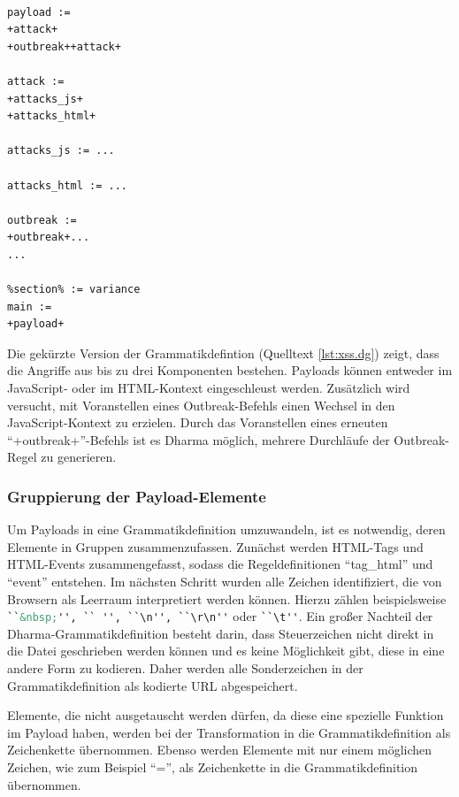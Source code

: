 \begin{lstlisting}[caption={Dharma: Auszug aus der XSS-Grammatikdefinition (xss.dg)},label=lst:xss.dg]
%section% := value

payload :=
+attack+
+outbreak++attack+

attack :=
+attacks_js+
+attacks_html+

attacks_js := ...

attacks_html := ... 

outbreak :=
+outbreak+...
...

%section% := variance
main :=
+payload+
\end{lstlisting}

Die gekürzte Version der Grammatikdefintion (Quelltext \ref{lst:xss.dg}) zeigt, dass die Angriffe aus bis zu drei Komponenten bestehen. Payloads können entweder im JavaScript- oder im HTML-Kontext eingeschleust werden. Zusätzlich wird versucht, mit Voranstellen eines Outbreak-Befehls einen Wechsel in den JavaScript-Kontext zu erzielen. Durch das Voranstellen eines erneuten ``+outbreak+''-Befehls ist es Dharma möglich, mehrere Durchläufe der Outbreak-Regel zu generieren.

\subsubsection{Gruppierung der Payload-Elemente}\label{ssec:element-classification}
Um Payloads in eine Grammatikdefinition umzuwandeln, ist es notwendig, deren Elemente in Gruppen zusammenzufassen. Zunächst werden HTML-Tags und HTML-Events zusammengefasst, sodass die Regeldefinitionen ``tag\_html'' und ``event'' entstehen. Im nächsten Schritt wurden alle Zeichen identifiziert, die von Browsern als Leerraum interpretiert werden können. Hierzu zählen beispielsweise \lstinline[language=html]!``&nbsp;'', `` '', ``\n'', ``\r\n''! oder \lstinline[language=html]!``\t''!. Ein großer Nachteil der Dharma-Grammatikdefinition besteht darin, dass Steuerzeichen nicht direkt in die Datei geschrieben werden können und es keine Möglichkeit gibt, diese in eine andere Form zu kodieren. Daher werden alle Sonderzeichen in der Grammatikdefinition als kodierte \ac{URL} abgespeichert.

Elemente, die nicht ausgetauscht werden dürfen, da diese eine spezielle Funktion im Payload haben, werden bei der Transformation in die Grammatikdefinition als Zeichenkette übernommen. Ebenso werden Elemente mit nur einem möglichen Zeichen, wie zum Beispiel ``='', als Zeichenkette in die Grammatikdefinition übernommen.


